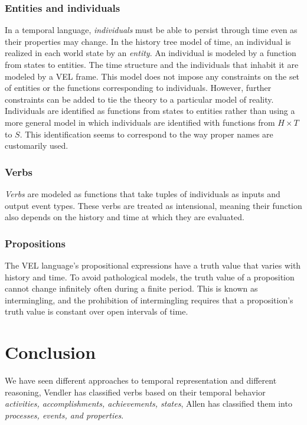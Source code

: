 \subsubsection{Entities and individuals}
In a temporal language, \textit{individuals} must be able to persist through time even as their properties may change.
In the history tree model of time, an individual is realized in each world state by an \textit{entity}.
An individual is modeled by a function from states to entities. The time structure and the individuals that inhabit it are modeled by a VEL frame. This model does not impose any constraints on the set of entities or the functions corresponding to individuals.
However, further constraints can be added to tie the theory to a particular model of reality.
Individuals are identified as functions from states to entities rather than using a more general model in which individuals are identified with functions from $H \times T$ to $S$. This identification seems to correspond to the way proper names are customarily used.

\subsubsection{Verbs}
\textit{Verbs} are modeled as functions that take tuples of individuals as inputs and output event types.
These verbs are treated as intensional, meaning their function also depends on the history and time at which they are evaluated.
\subsubsection{Propositions}
The VEL language's propositional expressions have a truth value that varies with history and time. To avoid pathological models, the truth value of a proposition cannot change infinitely often during a finite period. This is known as intermingling, and the prohibition of intermingling requires that a proposition's truth value is constant over open intervals of time.


\section{Conclusion}
We have seen different approaches to temporal representation and different reasoning,
Vendler has classified verbs based on their temporal behavior \textit{activities, accomplishments, achievements, states},
Allen has classified them into \textit{processes, events, and properties}.

